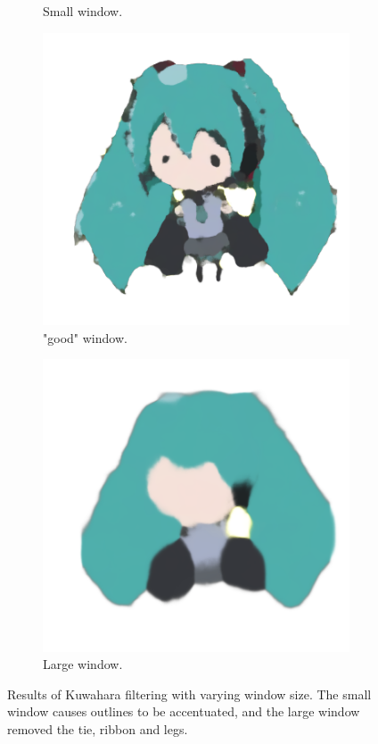 \begin{figure}[htb!]
\begin{subfigure}{.24\textwidth}
\caption{Small window.}
\end{subfigure}
\begin{subfigure}{.24\textwidth}
\includegraphics[width=\textwidth]{images/miku_d_filtered.png}
\caption{"good" window.}
\end{subfigure}
\begin{subfigure}{.24\textwidth}
\includegraphics[width=\textwidth]{images/miku_d_filtered_largeh.png}
\caption{Large window.}
\end{subfigure}
\caption{Results of Kuwahara filtering with varying window size. The small window causes outlines to be accentuated, and the large window removed the tie, ribbon and legs.}
\label{fig:kuwaharaExample}
\end{figure}

